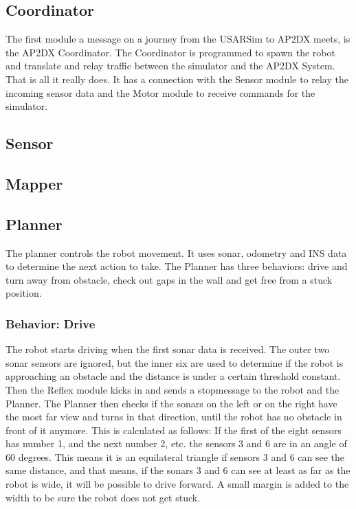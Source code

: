 \documentclass[titlepage, a4paper,10pt]{article}
\begin{document}
\subsection{Coordinator}
The first module a message on a journey from the USARSim to AP2DX meets, is the AP2DX Coordinator. The Coordinator is programmed to spawn the robot and translate and relay traffic between the simulator and the AP2DX System. That is all it really does. It has a connection with the Sensor module to relay the incoming sensor data and the Motor module to receive commands for the simulator.

\subsection{Sensor}


\subsection{Mapper}


\subsection{Planner}
The planner controls the robot movement. It uses sonar, odometry and INS data to determine the next action to take. The Planner has three behaviors: drive and turn away from obstacle, check out gaps in the wall and get free from a stuck position.

\subsubsection{Behavior: Drive}
The robot starts driving when the first sonar data is received. The outer two sonar sensors are ignored, but the inner six are used to determine if the robot is approaching an obstacle and the distance is under a certain threshold constant. Then the Reflex module kicks in and sends a stopmessage to the robot and the Planner. The Planner then checks if the sonars on the left or on the right have the most far view and turns in that direction, until the robot has no obstacle in front of it anymore. This is calculated as follows: If the first of the eight sensors has number 1, and the next number 2, etc. the sensors 3 and 6 are in an angle of 60 degrees. This means it is an equilateral triangle if sensors 3 and 6 can see the same distance, and that means, if the sonars 3 and 6 can see at least as far as the robot is wide, it will be possible to drive forward. A small margin is added to the width to be sure the robot does not get stuck.
\end{document}
